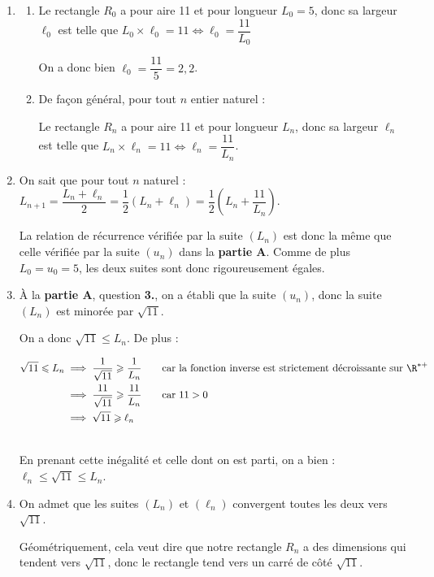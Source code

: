 \begin{enumerate}
\item 
	\begin{enumerate}
		\item Le rectangle $R_0$ a pour aire 11 et pour longueur $L_0 = 5$, donc sa largeur $\ell_{0}$ est telle que $L_0 \times \ell_0 = 11 \iff \ell_0 = \dfrac{11}{L_0}$

On a donc bien $\ell_{0}=\dfrac{11}{5} = 2,2$.

		\item De façon général, pour tout $n$ entier naturel :

		Le rectangle $R_n$ a pour aire 11 et pour longueur $L_n$, donc sa largeur $\ell_{n}$ est telle que $L_n \times \ell_n = 11 \iff \ell_n = \dfrac{11}{L_n}$.

	\end{enumerate}
\item On sait que pour tout $n$ naturel : $L_{n+1} = \dfrac{L_n + \ell_n}{2} = \dfrac{1}{2}\left(L_n + \ell_n\right)  = \dfrac{1}{2}\left(L_n + \dfrac{11}{L_n}\right)$.

La relation de récurrence vérifiée par la suite $(L_n)$ est donc la même que celle vérifiée par la suite $(u_n)$ dans la \textbf{partie A}. Comme de plus $L_0 = u_0 = 5$, les deux suites sont donc rigoureusement égales.
	\item À la \textbf{partie A}, question \textbf{3.}, on a établi que la suite $(u_n)$, donc la suite $(L_n)$ est minorée par $\sqrt{11}$.

On a donc $\sqrt{11}\leqslant L_n$. De plus :

$\aligned[t] \sqrt{11}\leqslant L_n &\implies \dfrac{1}{\sqrt{11}} \geqslant \dfrac{1}{L_n} \qquad\text{car la fonction inverse est strictement décroissante sur }\R^{*+}\\
&\implies \dfrac{11}{\sqrt{11}} \geqslant \dfrac{11}{L_n} \qquad \text{car } 11>0\\
&\implies \sqrt{11}\geqslant\ell_n\\
\\ \endaligned$

En prenant cette inégalité et celle dont on est parti, on a bien : $\ell_n \leqslant\sqrt{11} \leqslant L_n$.

\item On admet que les suites $\left(L_{n}\right)$ et $\left(\ell_{n}\right)$ convergent toutes les deux vers $\sqrt{11}$.

Géométriquement, cela veut dire que notre rectangle $R_n$ a des dimensions qui tendent vers $\sqrt{11}$, donc le rectangle tend vers un carré de côté $\sqrt{11}$.


\end{enumerate}
